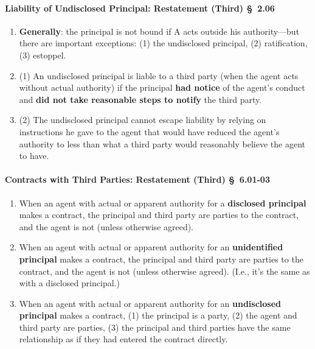 \paragraph{Liability of Undisclosed Principal: Restatement (Third) \S\ 2.06}

\begin{enumerate}
    \item \textbf{Generally}: the principal is not bound if A acts outside his 
    authority---but there are important exceptions: (1) the undisclosed 
    principal, (2) ratification, (3) estoppel.
    \item (1) An undisclosed principal is liable to a third party (when the 
    agent acts without actual authority) if the principal \textbf{had notice} 
    of the agent's conduct and \textbf{did not take reasonable steps to 
    notify} the third party.
    \item (2) The undisclosed principal cannot escape liability by relying on 
    instructions he gave to the agent that would have reduced the agent's 
    authority to less than what a third party would reasonably believe the 
    agent to have.
\end{enumerate}

\paragraph{Contracts with Third Parties: Restatement (Third) \S\ 6.01-03}

\begin{enumerate}
    \item When an agent with actual or apparent authority for a 
    \textbf{disclosed principal} makes a contract, the principal and third 
    party are parties to the contract, and the agent is not (unless otherwise 
    agreed).
    \item When an agent with actual or apparent authority for an 
    \textbf{unidentified principal} makes a contract, the principal and third 
    party are parties to the contract, and the agent is not (unless otherwise 
    agreed). (I.e., it's the same as with a disclosed principal.)
    \item When an agent with actual or apparent authority for an
    \textbf{undisclosed principal} makes a contract, (1) the principal is a 
    party, (2) the agent and third party are parties, (3) the principal and 
    third parties have the same relationship as if they had entered the 
    contract directly.
\end{enumerate}

